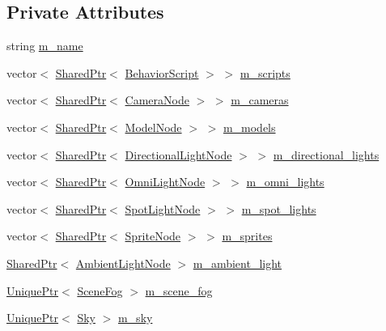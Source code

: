 \subsection*{Private Attributes}
\begin{DoxyCompactItemize}
\item 
string \hyperlink{classmage_1_1_scene_a6cc8cb08b1853c4e3063b33a94e8fb47}{m\+\_\+name}
\item 
vector$<$ \hyperlink{namespacemage_a1e01ae66713838a7a67d30e44c67703e}{Shared\+Ptr}$<$ \hyperlink{classmage_1_1_behavior_script}{Behavior\+Script} $>$ $>$ \hyperlink{classmage_1_1_scene_a84548bf6978f8955ce5892cb23536a4e}{m\+\_\+scripts}
\item 
vector$<$ \hyperlink{namespacemage_a1e01ae66713838a7a67d30e44c67703e}{Shared\+Ptr}$<$ \hyperlink{classmage_1_1_camera_node}{Camera\+Node} $>$ $>$ \hyperlink{classmage_1_1_scene_a76fc089ae3185c82702d2ca42fd820e7}{m\+\_\+cameras}
\item 
vector$<$ \hyperlink{namespacemage_a1e01ae66713838a7a67d30e44c67703e}{Shared\+Ptr}$<$ \hyperlink{classmage_1_1_model_node}{Model\+Node} $>$ $>$ \hyperlink{classmage_1_1_scene_a01132a667fbc1517f11ae561bc221071}{m\+\_\+models}
\item 
vector$<$ \hyperlink{namespacemage_a1e01ae66713838a7a67d30e44c67703e}{Shared\+Ptr}$<$ \hyperlink{namespacemage_a7637b5351fc0f66a10badd80ebb35899}{Directional\+Light\+Node} $>$ $>$ \hyperlink{classmage_1_1_scene_a895f2ae809c17be09072f6bb89fd4e9c}{m\+\_\+directional\+\_\+lights}
\item 
vector$<$ \hyperlink{namespacemage_a1e01ae66713838a7a67d30e44c67703e}{Shared\+Ptr}$<$ \hyperlink{namespacemage_a1724c6e6b6b5ba535cdd967cbbb4a669}{Omni\+Light\+Node} $>$ $>$ \hyperlink{classmage_1_1_scene_a881c3dd7e85e5069650f29fd2722bf78}{m\+\_\+omni\+\_\+lights}
\item 
vector$<$ \hyperlink{namespacemage_a1e01ae66713838a7a67d30e44c67703e}{Shared\+Ptr}$<$ \hyperlink{namespacemage_aeed5dee4ff6c591eabb0e9114256df4a}{Spot\+Light\+Node} $>$ $>$ \hyperlink{classmage_1_1_scene_a4e1954bc0b812d6a71123ca3ac9eeb75}{m\+\_\+spot\+\_\+lights}
\item 
vector$<$ \hyperlink{namespacemage_a1e01ae66713838a7a67d30e44c67703e}{Shared\+Ptr}$<$ \hyperlink{classmage_1_1_sprite_node}{Sprite\+Node} $>$ $>$ \hyperlink{classmage_1_1_scene_a2d68edf08b57dde36ec7cf1f5a91d281}{m\+\_\+sprites}
\item 
\hyperlink{namespacemage_a1e01ae66713838a7a67d30e44c67703e}{Shared\+Ptr}$<$ \hyperlink{namespacemage_ab0783a7428706251f8561dc30a4d228d}{Ambient\+Light\+Node} $>$ \hyperlink{classmage_1_1_scene_a0ce9718f4b0137a52b858a29d3504328}{m\+\_\+ambient\+\_\+light}
\item 
\hyperlink{namespacemage_a3316d7143a973e37adf1110f2e80ca31}{Unique\+Ptr}$<$ \hyperlink{structmage_1_1_scene_fog}{Scene\+Fog} $>$ \hyperlink{classmage_1_1_scene_a58f8d29322664c4c5895703a6cbc9000}{m\+\_\+scene\+\_\+fog}
\item 
\hyperlink{namespacemage_a3316d7143a973e37adf1110f2e80ca31}{Unique\+Ptr}$<$ \hyperlink{structmage_1_1_sky}{Sky} $>$ \hyperlink{classmage_1_1_scene_a90163a34ed39216b14175c4b799abd46}{m\+\_\+sky}
\end{DoxyCompactItemize}


